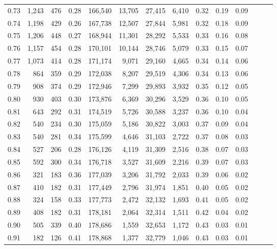 \begin{tabular}{rrrrrrrrrrrrrr}
0.73 &  1,243 &  476 &  0.28 &  166,540 &   13,705 &  27,415 &   6,410 &  0.32 &  0.19 &      0.09 \\
0.74 &  1,198 &  429 &  0.26 &  167,738 &   12,507 &  27,844 &   5,981 &  0.32 &  0.18 &      0.09 \\
0.75 &  1,206 &  448 &  0.27 &  168,944 &   11,301 &  28,292 &   5,533 &  0.33 &  0.16 &      0.08 \\
0.76 &  1,157 &  454 &  0.28 &  170,101 &   10,144 &  28,746 &   5,079 &  0.33 &  0.15 &      0.07 \\
0.77 &  1,073 &  414 &  0.28 &  171,174 &    9,071 &  29,160 &   4,665 &  0.34 &  0.14 &      0.06 \\
0.78 &    864 &  359 &  0.29 &  172,038 &    8,207 &  29,519 &   4,306 &  0.34 &  0.13 &      0.06 \\
0.79 &    908 &  374 &  0.29 &  172,946 &    7,299 &  29,893 &   3,932 &  0.35 &  0.12 &      0.05 \\
0.80 &    930 &  403 &  0.30 &  173,876 &    6,369 &  30,296 &   3,529 &  0.36 &  0.10 &      0.05 \\
0.81 &    643 &  292 &  0.31 &  174,519 &    5,726 &  30,588 &   3,237 &  0.36 &  0.10 &      0.04 \\
0.82 &    540 &  234 &  0.30 &  175,059 &    5,186 &  30,822 &   3,003 &  0.37 &  0.09 &      0.04 \\
0.83 &    540 &  281 &  0.34 &  175,599 &    4,646 &  31,103 &   2,722 &  0.37 &  0.08 &      0.03 \\
0.84 &    527 &  206 &  0.28 &  176,126 &    4,119 &  31,309 &   2,516 &  0.38 &  0.07 &      0.03 \\
0.85 &    592 &  300 &  0.34 &  176,718 &    3,527 &  31,609 &   2,216 &  0.39 &  0.07 &      0.03 \\
0.86 &    321 &  183 &  0.36 &  177,039 &    3,206 &  31,792 &   2,033 &  0.39 &  0.06 &      0.02 \\
0.87 &    410 &  182 &  0.31 &  177,449 &    2,796 &  31,974 &   1,851 &  0.40 &  0.05 &      0.02 \\
0.88 &    324 &  158 &  0.33 &  177,773 &    2,472 &  32,132 &   1,693 &  0.41 &  0.05 &      0.02 \\
0.89 &    408 &  182 &  0.31 &  178,181 &    2,064 &  32,314 &   1,511 &  0.42 &  0.04 &      0.02 \\
0.90 &    505 &  339 &  0.40 &  178,686 &    1,559 &  32,653 &   1,172 &  0.43 &  0.03 &      0.01 \\
0.91 &    182 &  126 &  0.41 &  178,868 &    1,377 &  32,779 &   1,046 &  0.43 &  0.03 &      0.01 \\

\end{tabular}
